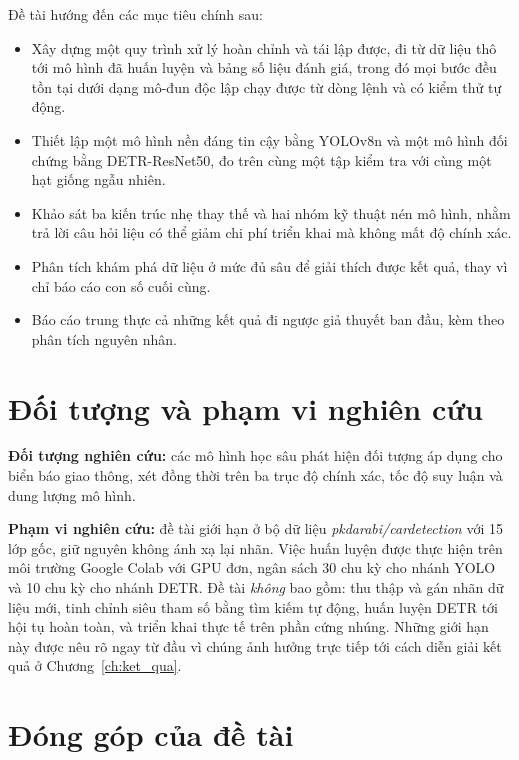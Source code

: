 Đề tài hướng đến các mục tiêu chính sau:

\begin{itemize}[leftmargin=1.5cm]
\item Xây dựng một quy trình xử lý hoàn chỉnh và tái lập được, đi từ dữ liệu thô tới mô hình đã
huấn luyện và bảng số liệu đánh giá, trong đó mọi bước đều tồn tại dưới dạng mô-đun độc lập chạy
được từ dòng lệnh và có kiểm thử tự động.

\item Thiết lập một mô hình nền đáng tin cậy bằng YOLOv8n và một mô hình đối chứng bằng
DETR-ResNet50, đo trên cùng một tập kiểm tra với cùng một hạt giống ngẫu nhiên.

\item Khảo sát ba kiến trúc nhẹ thay thế và hai nhóm kỹ thuật nén mô hình, nhằm trả lời câu hỏi
liệu có thể giảm chi phí triển khai mà không mất độ chính xác.

\item Phân tích khám phá dữ liệu ở mức đủ sâu để giải thích được kết quả, thay vì chỉ báo cáo con
số cuối cùng.

\item Báo cáo trung thực cả những kết quả đi ngược giả thuyết ban đầu, kèm theo phân tích nguyên
nhân.
\end{itemize}

\section{Đối tượng và phạm vi nghiên cứu}

\textbf{Đối tượng nghiên cứu:} các mô hình học sâu phát hiện đối tượng áp dụng cho biển báo giao
thông, xét đồng thời trên ba trục độ chính xác, tốc độ suy luận và dung lượng mô hình.

\textbf{Phạm vi nghiên cứu:} đề tài giới hạn ở bộ dữ liệu \textit{pkdarabi/cardetection} với 15
lớp gốc, giữ nguyên không ánh xạ lại nhãn. Việc huấn luyện được thực hiện trên môi trường Google
Colab với GPU đơn, ngân sách 30 chu kỳ cho nhánh YOLO và 10 chu kỳ cho nhánh DETR. Đề tài
\emph{không} bao gồm: thu thập và gán nhãn dữ liệu mới, tinh chỉnh siêu tham số bằng tìm kiếm tự
động, huấn luyện DETR tới hội tụ hoàn toàn, và triển khai thực tế trên phần cứng nhúng. Những
giới hạn này được nêu rõ ngay từ đầu vì chúng ảnh hưởng trực tiếp tới cách diễn giải kết quả ở
Chương~\ref{ch:ket_qua}.

\section{Đóng góp của đề tài}

